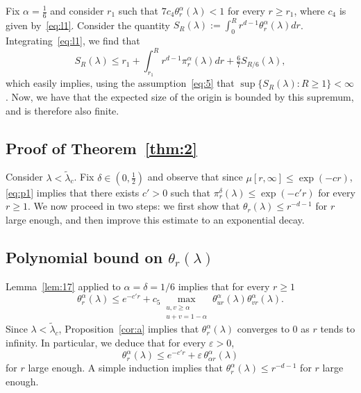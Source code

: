 \documentclass[AHL,Unicode,longabstracts]{cedram}
\newcommand{\ep}{\varepsilon}
\begin{document}
\begin{rema}\label{rmk:finite}
Fix $\alpha=\tfrac16$ and consider $r_1$ such that $7c_4\theta_r^\alpha(\lambda)<1$ for every $r\ge r_1$, where $c_4$ is given by~\eqref{eq:l1}. Consider the quantity $S_R(\lambda):=\int_{0}^R r^{d-1}\theta^\alpha_r(\lambda)dr$. Integrating~\eqref{eq:l1}, we find that
\[
S_R(\lambda)\le r_1+\int_{r_1}^Rr^{d-1}\pi^\alpha_r(\lambda)dr +\tfrac67S_{R/6}(\lambda),
\]
which easily implies, using the assumption~\eqref{eq:5} that $\sup\{S_R(\lambda):R\ge1\}<\infty$. Now, we have that the expected size of the origin is bounded by this supremum, and is therefore also finite.
\end{rema}

\subsection{Proof of Theorem~\ref{thm:2}}\label{sec:4.2}


Consider $\lambda<\widetilde \lambda_c$. Fix $\delta\in(0,\tfrac12)$ and observe that since $\mu[r,\infty]\le \exp(-cr)$, \eqref{eq:p1} implies that there exists $c'>0$ such that $\pi_r^\delta(\lambda)\le \exp(-c' r)$ for every $r\ge1$. We now proceed in two steps: we first show that $\theta_r(\lambda)\le r^{-d-1}$ for $r$ large enough, and then improve this estimate to an exponential decay.

\subsection{Polynomial bound on $\theta_r(\lambda)$}
Lemma~\ref{lem:17} applied to $\alpha=\delta=1/6$ implies that for every $r\ge 1$
\begin{equation}\label{eq:6}
\theta_r^\alpha(\lambda) \le e^{-c' r}+c_5 \max_{\substack{u,v\ge\alpha \\ u+v=1-\alpha}}\theta_{ur}^\alpha(\lambda)\theta_{vr}^\alpha(\lambda).
\end{equation}
Since $\lambda<\widetilde \lambda_c$, Proposition~\ref{cor:a} implies that $\theta_r^\alpha(\lambda)$ converges to $0$ as $r$ tends to infinity. In particular, we deduce that for every $\ep>0$,
\[
\theta_r^\alpha(\lambda)\le e^{-c' r}+\ep\,\theta_{\alpha r}^\alpha(\lambda)
\]
for $r$ large enough. A simple induction implies that $\theta_r^\alpha(\lambda)\le r^{-d-1}$ for $r$ large enough.
\end{document}
